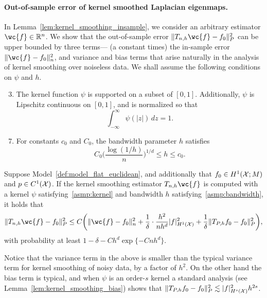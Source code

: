 \paragraph{Out-of-sample error of kernel smoothed Laplacian eigenmaps.}

In Lemma~\ref{lem:kernel_smoothing_insample}, we consider an arbitrary estimator $\wc{f} \in \Reals^n$. We show that the out-of-sample error $\|T_{n,h}\wc{f} - f_0\|_P^2$ can be upper bounded by three terms--- (a constant times) the in-sample error $\|\wc{f} - f_0\|_n^2$, and variance and bias terms that arise naturally in the analysis of kernel smoothing over noiseless data. We shall assume the following conditions on $\psi$ and $h$.
\begin{enumerate}[label=(K\arabic*)]
	\setcounter{enumi}{2}
	\item
	\label{asmp:kernel}
	The kernel function $\psi$ is supported on a subset of $[0,1]$. Additionally, $\psi$ is Lipschitz continuous on $[0,1]$, and is normalized so that
	\begin{equation*}
	\int_{-\infty}^{\infty} \psi(|z|) \,dz = 1.
	\end{equation*}
\end{enumerate}
\begin{enumerate}[label=(P\arabic*)]
	\setcounter{enumi}{6}
	\item
	\label{asmp:bandwidth}
	For constants $c_0$ and $C_0$, the bandwidth parameter $h$ satisfies
	\begin{equation*}
	C_0\biggl(\frac{\log(1/h)}{n}\biggr)^{1/d} \leq h \leq c_0.
	\end{equation*}
\end{enumerate}
\begin{lemma}
	\label{lem:kernel_smoothing_insample}
	Suppose Model~\ref{def:model_flat_euclidean}, and additionally that $f_0 \in H^1(\mathcal{X};M)$ and $p \in C^1(\mathcal{X})$. If the kernel smoothing estimator $T_{n,h}\wc{f}$ is computed with a kernel $\psi$ satisfying~\ref{asmp:kernel} and bandwidth $h$ satisfying~\ref{asmp:bandwidth}, it holds that
	\begin{equation}
	\label{eqn:kernel_smoothing_insample}
	\|T_{n,h}\wc{f} - f_0\|_P^2 \leq C\biggl(\|\wc{f} - f_0\|_n^2 + \frac{1}{\delta} \cdot \frac{h^2}{nh^d} |f|_{H^1(\mc{X})}^2 + \frac{1}{\delta}\|T_{P,h}f_0 - f_0\|_P^2\biggr),
	\end{equation}
	with probability at least $1 - \delta - Ch^d\exp\{-Cnh^d\}$. 
\end{lemma}
Notice that the variance term in the above is smaller than the typical variance term for kernel smoothing of noisy data, by a factor of $h^2$. On the other hand the bias term is typical, and when $\psi$ is an order-$s$ kernel a standard analysis (see Lemma~\ref{lem:kernel_smoothing_bias}) shows that $\|T_{P,h}f_0 - f_0\|_P^2 \lesssim |f|_{H^s(\mathcal{X})}^2 h^{2s}$.
